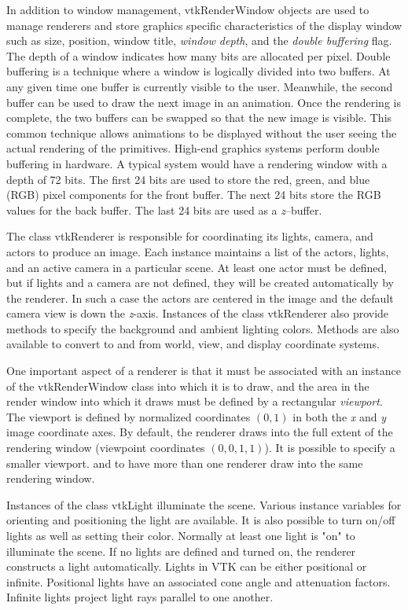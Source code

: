 In addition to window management, vtkRenderWindow objects are used to manage renderers and store graphics specific characteristics of the display window such as size, position, window title, \emph{window depth}, and the \emph{double buffering} flag. The depth of a window indicates how many bits are allocated per pixel. Double buffering is a technique where a window is logically divided into two buffers. At any given time one buffer is currently visible to the user. Meanwhile, the second buffer can be used to draw the next image in an animation. Once the rendering is complete, the two buffers can be swapped so that the new image is visible. This common technique allows animations to be displayed without the user seeing the actual rendering of the primitives. High-end graphics systems perform double buffering in hardware. A typical system would have a rendering window with a depth of 72 bits. The first 24 bits are used to store the red, green, and blue (RGB) pixel components for the front buffer. The next 24 bits store the RGB values for the back buffer. The last 24 bits are used as a \emph{z}--buffer.

The class vtkRenderer is responsible for coordinating its lights, camera, and actors to produce an image. Each instance maintains a list of the actors, lights, and an active camera in a particular scene. At least one actor must be defined, but if lights and a camera are not defined, they will be created automatically by the renderer. In such a case the actors are centered in the image and the default camera view is down the \emph{z}-axis. Instances of the class vtkRenderer also provide methods to specify the background and ambient lighting colors. Methods are also available to convert to and from world, view, and display coordinate systems.

One important aspect of a renderer is that it must be associated with an instance of the vtkRenderWindow class into which it is to draw, and the area in the render window into which it draws must be defined by a rectangular \emph{viewport}. The viewport is defined by normalized coordinates $(0,1)$ in both the \emph{x} and \emph{y} image coordinate axes. By default, the renderer draws into the full extent of the rendering window (viewpoint coordinates $(0,0,1,1)$). It is possible to specify a smaller viewport. and to have more than one renderer draw into the same rendering window.

Instances of the class vtkLight illuminate the scene. Various instance variables for orienting and positioning the light are available. It is also possible to turn on/off lights as well as setting their color. Normally at least one light is "on" to illuminate the scene. If no lights are defined and turned on, the renderer constructs a light automatically. Lights in VTK can be either positional or infinite. Positional lights have an associated cone angle and attenuation factors. Infinite lights project light rays parallel to one another.

